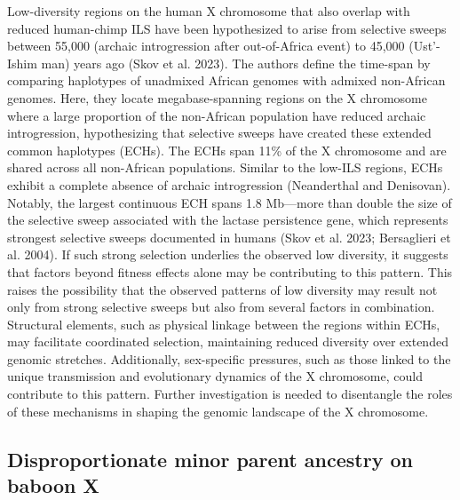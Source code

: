 \documentclass[
  11pt,
  a4paper,
]{scrbook}
\begin{document}
Low-diversity regions on the human X chromosome that also overlap with
reduced human-chimp ILS have been hypothesized to arise from selective
sweeps between 55,000 (archaic introgression after out-of-Africa event)
to 45,000 (Ust'-Ishim man) years ago (Skov et al. 2023). The authors
define the time-span by comparing haplotypes of unadmixed African
genomes with admixed non-African genomes. Here, they locate
megabase-spanning regions on the X chromosome where a large proportion
of the non-African population have reduced archaic introgression,
hypothesizing that selective sweeps have created these extended common
haplotypes (ECHs). The ECHs span 11\% of the X chromosome and are shared
across all non-African populations. Similar to the low-ILS regions, ECHs
exhibit a complete absence of archaic introgression (Neanderthal and
Denisovan). Notably, the largest continuous ECH spans 1.8 Mb---more than
double the size of the selective sweep associated with the lactase
persistence gene, which represents strongest selective sweeps documented
in humans (Skov et al. 2023; Bersaglieri et al. 2004). If such strong
selection underlies the observed low diversity, it suggests that factors
beyond fitness effects alone may be contributing to this pattern. This
raises the possibility that the observed patterns of low diversity may
result not only from strong selective sweeps but also from several
factors in combination. Structural elements, such as physical linkage
between the regions within ECHs, may facilitate coordinated selection,
maintaining reduced diversity over extended genomic stretches.
Additionally, sex-specific pressures, such as those linked to the unique
transmission and evolutionary dynamics of the X chromosome, could
contribute to this pattern. Further investigation is needed to
disentangle the roles of these mechanisms in shaping the genomic
landscape of the X chromosome.

\subsection{Disproportionate minor parent ancestry on baboon
X}\label{disproportionate-minor-parent-ancestry-on-baboon-x}
\end{document}
